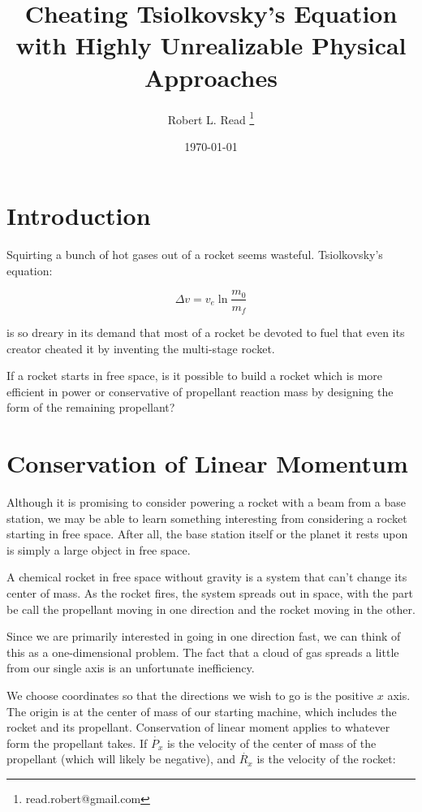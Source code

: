 \documentclass[11pt]{article}
\title{Cheating Tsiolkovsky's Equation with Highly Unrealizable Physical Approaches}
\author{Robert L. Read
  \thanks{read.robert@gmail.com}
}
\affil{Founder, Public Invention, an educational non-profit.}
\date{\today}
\begin{document}
\maketitle


\section{Introduction}

Squirting a bunch of hot gases out of a rocket seems wasteful.
Tsiolkovsky's equation:

\[
\tag{The Rocket Equation} \Delta v = v_e \ln \frac{m_0}{m_f} 
\]

is so dreary in its demand that most of a rocket be devoted to fuel
that even its creator cheated it by inventing the multi-stage rocket.

If a rocket starts in free space, 
is it possible to build a rocket which is more efficient in power or
conservative of propellant reaction mass by designing the form
of the remaining propellant?

\section{Conservation of Linear Momentum}

Although it is promising to consider powering a rocket with a beam
from a base station, we may be able to learn something interesting from
considering a rocket starting in free space. After all, the base station
itself or the planet it rests upon is simply a large object in free space.

A chemical rocket in free space without gravity is a system that can't
change its center of mass. As the rocket fires, the system spreads out
in space, with the part be call the propellant moving in one direction
and the rocket moving in the other.


Since we are primarily interested in going in one direction fast, we
can think of this as a one-dimensional problem. The fact that a cloud
of gas spreads a little from our single axis is an unfortunate inefficiency.

We choose coordinates so that the directions we wish to go is the positive $x$ axis.
The origin is at the center of mass of our starting machine, which includes the rocket
and its propellant.
Conservation of linear moment applies to whatever form the propellant takes.
If $\dot{P_x}$ is the velocity of the center of mass of the propellant (which will
likely be negative), and $\dot{R_x}$ is the velocity of the rocket:
\end{document}
